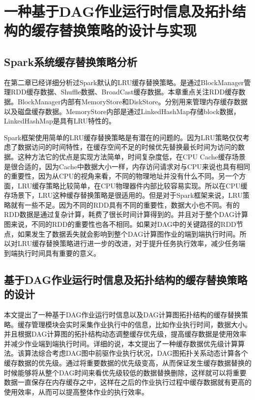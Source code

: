 \chapter{一种基于DAG作业运行时信息及拓扑结构的缓存替换策略的设计与实现}\label{chap:guide}
\section{Spark系统缓存替换策略分析}

在第二章已经详细分析过Spark默认的LRU缓存替换策略。是通过BlockManager管理RDD缓存数据、Shuffle数据、BroadCast缓存数据。本章重点关注RDD缓存数据。BlockManager内部有MemoryStore和DiskStore。分别用来管理内存缓存数据以及磁盘缓存数据。MemoryStore内部是通过LinkedHashMap存储block数据，LinkedHashMap是具有LRU特性的。

Spark框架使用简单的LRU缓存替换策略是有潜在的问题的。因为LRU策略仅仅考虑了数据访问的时间特性，在缓存空间不足的时候优先替换最长时间为访问的数据。这种方法它的优点是实现方法简单，时间复杂度低，在CPU Cache缓存场景是很合适的，因为Cache中数据大小一样，内存访问请求对与CPU来说也具有相同的重要性，因为从CPU的视角来看，不同的物理地址并没有什么不同。另一个方面，LRU缓存策略比较简单，在CPU物理器件内部比较容易实现。所以在CPU缓存场景下，LRU这种缓存替换策略是很适用的。但是对于Spark框架来说，LRU策略就有一些不足。因为不同的RDD具有不同的重要性，数据大小也不同。有的RDD数据是通过复杂计算，耗费了很长时间计算得到的。并且对于整个DAG计算图来说，不同的RDD的重要性也各不相同。如果对DAG中的关键路径的RDD节点，如果发生了数据丢失就会影响到整个DAG计算图作业的端到端执行时间。所以对LRU缓存替换策略进行进一步的改进，对于提升任务执行效率，减少任务端到端执行时间具有重要的意义。

\section{基于DAG作业运行时信息及拓扑结构的缓存替换策略的设计}

本文提出了一种基于DAG作业运行时信息以及DAG计算图拓扑结构的缓存替换策略。缓存管理模块会实时采集作业执行中的信息，比如作业执行时间，数据大小。并且根据DAG计算图的拓扑结构动态调整缓存优先级，提高缓存数据是使用效率并减少作业端到端执行时间。详细的说，本文提出了一种缓存数据优先级计算算法。该算法综合考虑DAG图中前驱作业执行状况，DAG图拓扑关系动态计算各个缓存数据的优先级。通过将重要数据的优先级变高，从而保证发生缓存数据替换的时候能够将从整个DAG时间来看优先级较低的数据替换删除，这样就可以将重要数据一直保存在内存缓存之中，这样在之后的作业执行过程中缓存数据就有更高的使用效率，从而可以提高整体作业的执行效率。

